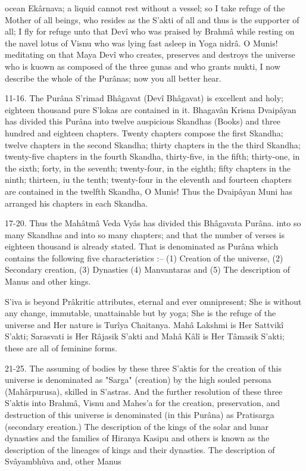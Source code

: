  

ocean Ekârnava; a liquid cannot rest without a vessel; so I take refuge of the Mother of all beings, who resides as the S’akti of all and thus is the supporter of all; I fly for refuge unto that Devî who was praised by Brahmâ while resting on the navel lotus of Visnu who was lying fast asleep in Yoga nidrâ. O Munis! meditating on that Maya Devî who creates, preserves and destroys the universe who is kuown as composed of the three gunas and who grants mukti, I now describe the whole of the Purânas; now you all better hear.

 

11-16. The Purâna S’rimad Bhâgavat (Devî Bhâgavat) is excellent and holy; eighteen thousand pure S’lokas are contained in it. Bhagavân Krisna Dvaipâyan has divided this Purâna into twelve auspicious Skandhas (Books) and three hundred and eighteen chapters. Twenty chapters compose the first Skandha; twelve chapters in the second Skandha; thirty chapters in the the third Skandha; twenty-five chapters in the fourth Skandha, thirty-five, in the fifth; thirty-one, in the sixth; forty, in the seventh; twenty-four, in the eighth; fifty chapters in the ninth; thirteen, iu the tenth; twenty-four in the eleventh and fourteen chapters are contained in the twelfth Skandha, O Munis! Thus the Dvaipâyan Muni has arranged his chapters in each Skandha.

 

17-20. Thus the Mahâtmâ Veda Vyâs has divided this Bhâgavata Purâna. into so many Skandhas and into so many chapters; and that the number of verses is eighteen thousand is already stated. That is denominated as Purâna which contains the following five characteristics :-- (1) Creation of the universe, (2) Secondary creation, (3) Dynasties (4) Manvantaras and (5) The description of Manus and other kings.

 

S’iva is beyond Prâkritic attributes, eternal and ever omnipresent; She is without any change, immutable, unattainable but by yoga; She is the refuge of the universe and Her nature is Turîya Chaitanya. Mahâ Lakshmi is Her Sattvikî S’akti; Sarasvati is Her Râjasik S’akti and Mahâ Kâlî is Her Tâmasik S’akti; these are all of feminine forms.

 

21-25. The assuming of bodies by these three S’aktis for the creation of this universe is denominated as "Sarga" (creation) by the high souled persona (Mahârpurusa), skilled in S’astras. And the further resolution of these three S’aktis into Brahmâ, Visnu and Mahes'a for the creation, preservation, and destruction of this universe is denominated (in this Purâna) as Pratisarga (secondary ereation.) The description of the kings of the solar and lunar dynasties and the families of Hiranya Kasipu and others is known as the description of the lineages of kings and their dynasties. The description of Svâyambhûva and, other Manus

